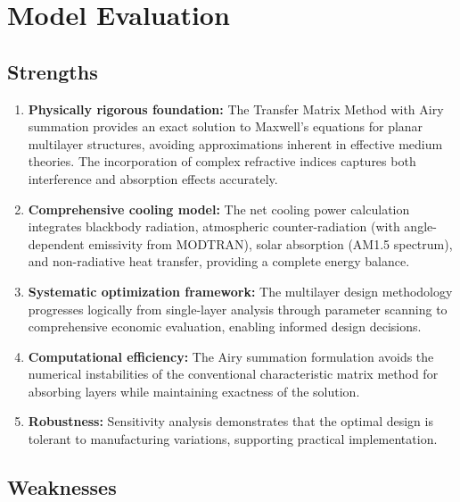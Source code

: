 \section{Model Evaluation}

\subsection{Strengths}

\begin{enumerate}
  \item \textbf{Physically rigorous foundation:} The Transfer Matrix Method with Airy summation provides an exact solution to Maxwell's equations for planar multilayer structures, avoiding approximations inherent in effective medium theories. The incorporation of complex refractive indices captures both interference and absorption effects accurately.

  \item \textbf{Comprehensive cooling model:} The net cooling power calculation integrates blackbody radiation, atmospheric counter-radiation (with angle-dependent emissivity from MODTRAN), solar absorption (AM1.5 spectrum), and non-radiative heat transfer, providing a complete energy balance.

  \item \textbf{Systematic optimization framework:} The multilayer design methodology progresses logically from single-layer analysis through parameter scanning to comprehensive economic evaluation, enabling informed design decisions.

  \item \textbf{Computational efficiency:} The Airy summation formulation avoids the numerical instabilities of the conventional characteristic matrix method for absorbing layers while maintaining exactness of the solution.

  \item \textbf{Robustness:} Sensitivity analysis demonstrates that the optimal design is tolerant to manufacturing variations, supporting practical implementation.
\end{enumerate}

\subsection{Weaknesses}

